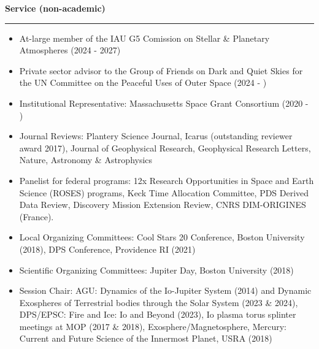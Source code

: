 \documentclass[12pt]{report}
\begin{document}
\noindent\bf{Service (non-academic)}\rm \hspace*{\fill} \\
\rule{\textwidth}{1pt}
\begin{itemize} \itemsep -2pt %
  \item At-large member of the IAU G5 Comission on Stellar \& Planetary Atmospheres (2024 - 2027)
  \item Private sector advisor to the Group of Friends on Dark and Quiet Skies for the UN Committee on the Peaceful Uses of Outer Space (2024 - )
  \item Institutional Representative: Massachusetts Space Grant Consortium (2020 - )
  \item Journal Reviews: Plantery Science Journal, Icarus (outstanding reviewer award 2017), Journal of Geophysical Research, Geophysical Research Letters, Nature, Astronomy \& Astrophysics
  \item Panelist for federal programs: 12x Research Opportunities in Space and Earth Science (ROSES) programs, Keck Time Allocation Committee, PDS Derived Data Review, Discovery Mission Extension Review,  CNRS DIM-ORIGINES (France).
  \item Local Organizing Committees: Cool Stars 20 Conference, Boston University (2018), DPS Conference, Providence RI (2021)
  \item Scientific Organizing Committees: Jupiter Day, Boston University (2018)
  \item Session Chair: AGU: Dynamics of the Io-Jupiter System (2014) and Dynamic Exospheres of Terrestrial bodies through the Solar System (2023 \& 2024), DPS/EPSC: Fire and Ice: Io and Beyond (2023), Io plasma torus splinter meetings at MOP (2017 \& 2018), Exosphere/Magnetosphere, Mercury: Current and Future Science of the Innermost Planet, USRA (2018)
\end{itemize}
\vspace{2 mm}
\end{document}

